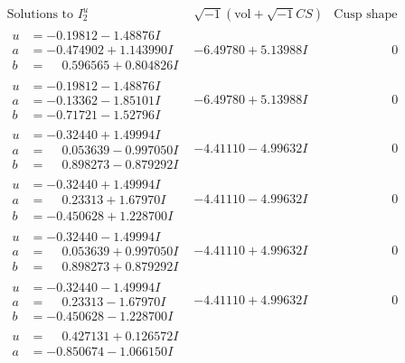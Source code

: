 \documentclass[1p]{elsarticle_modified}
\theoremstyle{definition}
\newcommand{\I}{\sqrt{-1}}
\begin{document}
$$\begin{array}{c|c|c}
\text{Solutions to }I^u_{2}& \I (\text{vol} + \sqrt{-1}CS) & \text{Cusp shape}\\
 \hline 
\begin{aligned}
u &= -0.19812 - 1.48876 I \\
a &= -0.474902 + 1.143990 I \\
b &= \phantom{-}0.596565 + 0.804826 I\end{aligned}
 & -6.49780 + 5.13988 I & \phantom{-0.000000 } 0 \\ \hline\begin{aligned}
u &= -0.19812 - 1.48876 I \\
a &= -0.13362 - 1.85101 I \\
b &= -0.71721 - 1.52796 I\end{aligned}
 & -6.49780 + 5.13988 I & \phantom{-0.000000 } 0 \\ \hline\begin{aligned}
u &= -0.32440 + 1.49994 I \\
a &= \phantom{-}0.053639 - 0.997050 I \\
b &= \phantom{-}0.898273 - 0.879292 I\end{aligned}
 & -4.41110 - 4.99632 I & \phantom{-0.000000 } 0 \\ \hline\begin{aligned}
u &= -0.32440 + 1.49994 I \\
a &= \phantom{-}0.23313 + 1.67970 I \\
b &= -0.450628 + 1.228700 I\end{aligned}
 & -4.41110 - 4.99632 I & \phantom{-0.000000 } 0 \\ \hline\begin{aligned}
u &= -0.32440 - 1.49994 I \\
a &= \phantom{-}0.053639 + 0.997050 I \\
b &= \phantom{-}0.898273 + 0.879292 I\end{aligned}
 & -4.41110 + 4.99632 I & \phantom{-0.000000 } 0 \\ \hline\begin{aligned}
u &= -0.32440 - 1.49994 I \\
a &= \phantom{-}0.23313 - 1.67970 I \\
b &= -0.450628 - 1.228700 I\end{aligned}
 & -4.41110 + 4.99632 I & \phantom{-0.000000 } 0 \\ \hline\begin{aligned}
u &= \phantom{-}0.427131 + 0.126572 I \\
a &= -0.850674 - 1.066150 I \\

\end{aligned}
\end{array}$$
\end{document}
